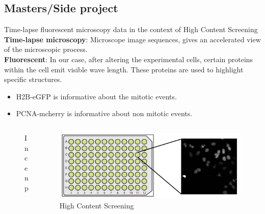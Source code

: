 \documentclass{beamer}
\begin{document}
\subsection{Masters/Side project}
\begin{frame}{Time-lapse fluorescent microscopy data in the context of High Content Screening}
\textbf{Time-lapse microscopy}: Microscope image sequences, gives an accelerated view of the microscopic process. \\
\textbf{Fluorescent}:  In our case, after altering the experimental cells, certain proteins within the cell emit visible wave length. These proteins are used to highlight specific structures.
\begin{itemize}
\item H2B-eGFP is informative about the mitotic events.
\item PCNA-mcherry is informative about non mitotic events.
\end{itemize}

\begin{columns}[T] %

\begin{column}{.45\textwidth}
\begin{figure}
\centering
{}
\caption{Incenp}
\end{figure}
\end{column}

\begin{column}{.45\textwidth}
\begin{figure}
\centering
\includegraphics[width=\textwidth]{Images/plate_well.png}
\caption{High Content Screening}
\end{figure}
\end{column}
\end{columns}
\end{frame}
\end{document}
